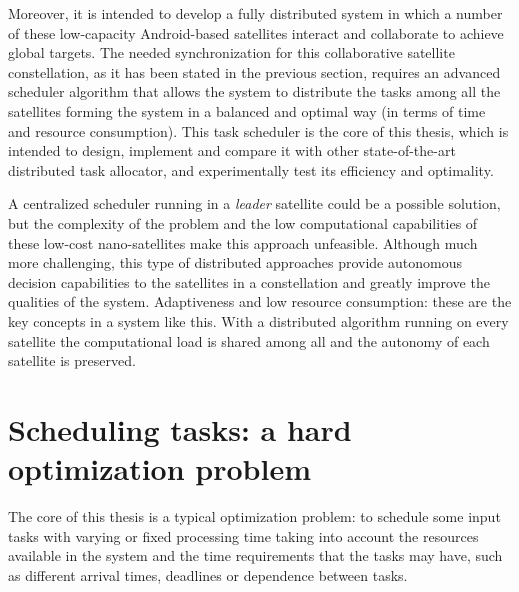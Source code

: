 Moreover, it is intended to develop a fully distributed system in which a number of these low-capacity Android-based satellites interact and collaborate to achieve global targets. The needed synchronization for this collaborative satellite constellation, as it has been stated in the previous section, requires an advanced scheduler algorithm that allows the system to distribute the tasks among all the satellites forming the system in a balanced and optimal way (in terms of time and resource consumption). This task scheduler is the core of this thesis, which is intended to design, implement and compare it with other state-of-the-art distributed task allocator, and experimentally test its efficiency and optimality.

A centralized scheduler running in a \emph{leader} satellite could be a possible solution, but the complexity of the problem and the low computational capabilities of these low-cost nano-satellites make this approach unfeasible. Although much more challenging, this type of distributed approaches provide autonomous decision capabilities to the satellites in a constellation and greatly improve the qualities of the system. Adaptiveness and low resource consumption: these are the key concepts in a system like this. With a distributed algorithm running on every satellite the computational load is shared among all and the autonomy of each satellite is preserved.

\section{Scheduling tasks: a hard optimization problem}


The core of this thesis is a typical optimization problem: to schedule some input tasks with varying or fixed processing time taking into account the resources available in the system and the time requirements that the tasks may have, such as different arrival times, deadlines or dependence between tasks.

